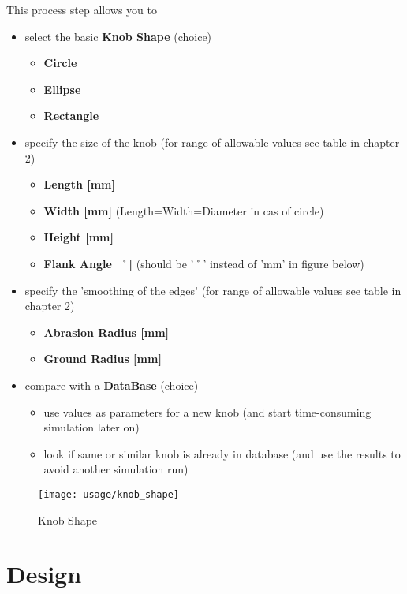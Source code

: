This process step allows you to 
\begin{itemize}
\item select the basic {\bf Knob Shape} (choice)
	\begin{itemize}
	\item {\bf Circle}	
	\item {\bf Ellipse}
	\item {\bf Rectangle}
	\end{itemize}
\item specify the size of the knob (for range of allowable values see table in chapter
2)
	\begin{itemize}
	\item {\bf Length [mm]} 
	\item {\bf Width [mm]} (Length=Width=Diameter in cas of circle)
	\item {\bf Height [mm]} 
	\item {\bf Flank Angle [$\symbol{23}$]} (should be '$\symbol{23}$' instead of 'mm' in figure below)
	\end{itemize}	
\item specify the 'smoothing of the edges' (for range of allowable values see table in chapter
2)
	\begin{itemize}
	\item {\bf Abrasion Radius [mm]}
	\item {\bf Ground Radius [mm]}
	\end{itemize}
\item compare with a {\bf DataBase} (choice)
	\begin{itemize}
 	\item use values as parameters for a new knob 
	(and start time-consuming simulation later on) 
	\item look if same or similar knob is already in database
	(and use the results to avoid another simulation run)
	\end{itemize}	
\end{itemize}


\begin{figure}[!Hhtp]
  \begin{center}
   \texttt{[image: usage/knob\_shape]}
   \caption{Knob Shape}
  \end{center}
\end{figure}
\clearpage

\section{Design}

